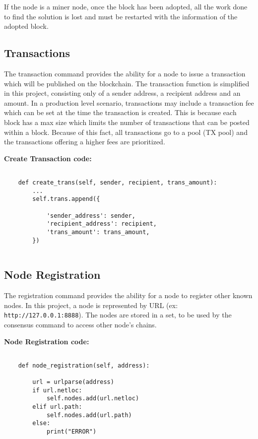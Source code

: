 If the node is a miner node, once the block has been adopted, all the
work done to find the solution is lost and must be restarted with the
information of the adopted block.

\subsection{Transactions}

The transaction command provides the ability for a node to issue a
transaction which will be published on the blockchain. The transaction
function is simplified in this project, consisting only of a sender
address, a recipient address and an amount. In a production level
scenario, transactions may include a transaction fee which can be set
at the time the transaction is created. This is because each block has
a max size which limits the number of transactions that can be posted
within a block. Because of this fact, all transactions go to a pool
(TX pool) and the transactions offering a higher fees are prioritized.

\bigskip
\noindent
\textbf{Create Transaction code:}
\begin{footnotesize}
\begin{verbatim}

    def create_trans(self, sender, recipient, trans_amount):
        ...
        self.trans.append({

            'sender_address': sender,
            'recipient_address': recipient,
            'trans_amount': trans_amount,
        })
        
\end{verbatim}
\end{footnotesize}

\subsection{Node Registration}

The registration command provides the ability for a node to register
other known nodes. In this project, a node is represented by
URL (ex: \verb|http://127.0.0.1:8888|). The nodes are stored in a set, to be
used by the consensus command to access other node's chains.

\bigskip
\noindent
\textbf{Node Registration code:}
\begin{footnotesize}
\begin{verbatim}

    def node_registration(self, address):

        url = urlparse(address)
        if url.netloc:
            self.nodes.add(url.netloc)
        elif url.path:
            self.nodes.add(url.path)
        else:
            print("ERROR")
        
\end{verbatim}
\end{footnotesize}


